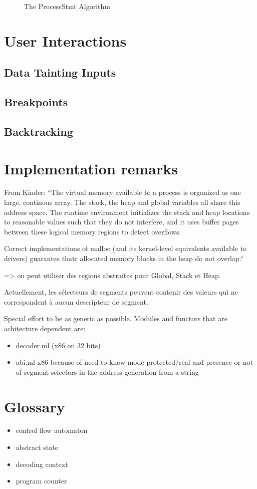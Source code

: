 \documentclass{report}
\begin{document}
\begin{figure}
\begin{algorithm}[H]
\end{algorithm}
\caption{The ProcessStmt Algorithm}
\label{algo:processStmt}
\end{figure}
\chapter{User Interactions}
\section{Data Tainting Inputs}
\section{Breakpoints}
\section{Backtracking}

\chapter{Implementation remarks}

From Kinder:
``The virtual memory available to a process is organized as one large,
continous array. The stack, the heap and global variables all share
this address space. The runtime environment initializes the stack and
heap locations to reasonable values such that they do not interfere,
and it uses buffer pages between these logical memory regions to
detect overflows.

Correct implementations of malloc (and its kernel-level equivalents
available to drivers) guarantee thatr allocated memory blocks in the
heap do not overlap.``

=> on peut utiliser des regions abstraites pour Global, Stack et Heap.

Actuellement, les sélecteurs de segments peuvent contenir des valeurs
qui ne correspondent à aucun descripteur de segment.

Special effort to be as generic as possible.
Modules and functors that are achitecture dependent are:
\begin{itemize}
\item decoder.ml (x86 on 32 bits)
\item abi.ml x86 because of need to know mode protected/real and
  presence or not of segment selectors in the address generation from
  a string
\end{itemize}
\chapter{Glossary}
\begin{itemize}
\item control flow automaton
\item abstract state
\item decoding context
\item program counter
\end{itemize}
\end{document}
